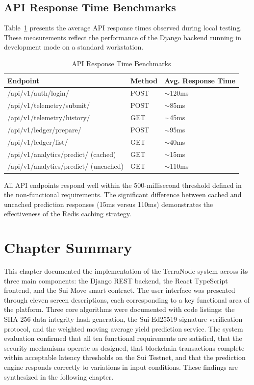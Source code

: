 \subsection{API Response Time Benchmarks}

Table~\ref{tab:api_perf} presents the average API response times observed during local testing. These measurements reflect the performance of the Django backend running in development mode on a standard workstation.

\begin{table}[H]
\centering
\caption{API Response Time Benchmarks}
\label{tab:api_perf}
\begin{tabularx}{\textwidth}{|X|l|l|}
\hline
\textbf{Endpoint} & \textbf{Method} & \textbf{Avg. Response Time} \\
\hline
/api/v1/auth/login/ & POST & $\sim$120ms \\
\hline
/api/v1/telemetry/submit/ & POST & $\sim$85ms \\
\hline
/api/v1/telemetry/history/ & GET & $\sim$45ms \\
\hline
/api/v1/ledger/prepare/ & POST & $\sim$95ms \\
\hline
/api/v1/ledger/list/ & GET & $\sim$40ms \\
\hline
/api/v1/analytics/predict/ (cached) & GET & $\sim$15ms \\
\hline
/api/v1/analytics/predict/ (uncached) & GET & $\sim$110ms \\
\hline
\end{tabularx}
\end{table}

All API endpoints respond well within the 500-millisecond threshold defined in the non-functional requirements. The significant difference between cached and uncached prediction responses (15ms versus 110ms) demonstrates the effectiveness of the Redis caching strategy.

\section{Chapter Summary}

This chapter documented the implementation of the TerraNode system across its three main components: the Django REST backend, the React TypeScript frontend, and the Sui Move smart contract. The user interface was presented through eleven screen descriptions, each corresponding to a key functional area of the platform. Three core algorithms were documented with code listings: the SHA-256 data integrity hash generation, the Sui Ed25519 signature verification protocol, and the weighted moving average yield prediction service. The system evaluation confirmed that all ten functional requirements are satisfied, that the security mechanisms operate as designed, that blockchain transactions complete within acceptable latency thresholds on the Sui Testnet, and that the prediction engine responds correctly to variations in input conditions. These findings are synthesized in the following chapter.
